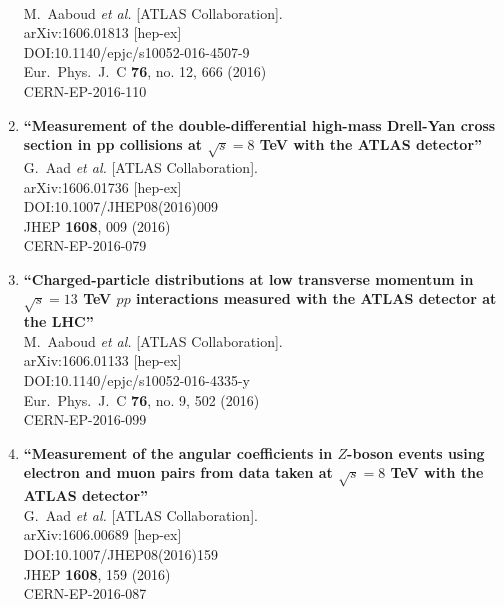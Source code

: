 \documentclass{article}
\begin{document}
\begin{enumerate}
  \\{}M.~Aaboud {\it et al.} [ATLAS Collaboration].
  \\{}arXiv:1606.01813 [hep-ex]
  \\{}DOI:10.1140/epjc/s10052-016-4507-9
  \\{}Eur.\ Phys.\ J.\ C {\bf 76}, no. 12, 666 (2016)
  \\{}CERN-EP-2016-110
\item%
{\bf ``Measurement of the double-differential high-mass Drell-Yan cross section in pp collisions at $ \sqrt{s}=8 $ TeV with the ATLAS detector''}
  \\{}G.~Aad {\it et al.} [ATLAS Collaboration].
  \\{}arXiv:1606.01736 [hep-ex]
  \\{}DOI:10.1007/JHEP08(2016)009
  \\{}JHEP {\bf 1608}, 009 (2016)
  \\{}CERN-EP-2016-079
\item%
{\bf ``Charged-particle distributions at low transverse momentum in $\sqrt{s} = 13$  TeV $pp$ interactions measured with the ATLAS detector at the LHC''}
  \\{}M.~Aaboud {\it et al.} [ATLAS Collaboration].
  \\{}arXiv:1606.01133 [hep-ex]
  \\{}DOI:10.1140/epjc/s10052-016-4335-y
  \\{}Eur.\ Phys.\ J.\ C {\bf 76}, no. 9, 502 (2016)
  \\{}CERN-EP-2016-099
\item%
{\bf ``Measurement of the angular coefficients in $Z$-boson events using electron and muon pairs from data taken at $\sqrt{s}=8$ TeV with the ATLAS detector''}
  \\{}G.~Aad {\it et al.} [ATLAS Collaboration].
  \\{}arXiv:1606.00689 [hep-ex]
  \\{}DOI:10.1007/JHEP08(2016)159
  \\{}JHEP {\bf 1608}, 159 (2016)
  \\{}CERN-EP-2016-087

\end{enumerate}
\end{document}
